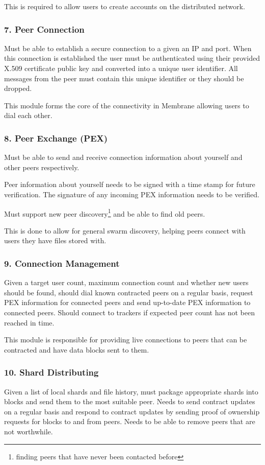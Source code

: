 \documentclass[11pt, a4paper, twoside]{report}
\begin{document}
This is required to allow users to create accounts on the distributed network.

\subsubsection{7. Peer Connection}
Must be able to establish a secure connection to a given an IP and port. When this connection is established the user must be authenticated using their provided X.509 certificate public key and converted into a unique user identifier. All messages from the peer must contain this unique identifier or they should be dropped.

This module forms the core of the connectivity in Membrane allowing users to dial each other.

\subsubsection{8. Peer Exchange (PEX)}
Must be able to send and receive connection information about yourself and other peers respectively.

Peer information about yourself needs to be signed with a time stamp for future verification. The signature of any incoming PEX information needs to be verified.

Must support new peer discovery\footnote{finding peers that have never been contacted before} and be able to find old peers.

This is done to allow for general swarm discovery, helping peers connect with users they have files stored with.

\subsubsection{9. Connection Management}
Given a target user count, maximum connection count and whether new users should be found, should dial known contracted peers on a regular basis, request PEX information for connected peers and send up-to-date PEX information to connected peers. Should connect to trackers if expected peer count has not been reached in time.

This module is responsible for providing live connections to peers that can be contracted and have data blocks sent to them.

\subsubsection{10. Shard Distributing}
Given a list of local shards and file history, must package appropriate shards into blocks and send them to the most suitable peer. Needs to send contract updates on a regular basis and respond to contract updates by sending proof of ownership requests for blocks to and from peers. Needs to be able to remove peers that are not worthwhile.
\end{document}
